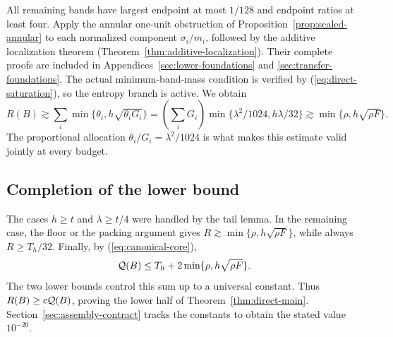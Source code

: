 All remaining bands have largest endpoint at most $1/128$ and
endpoint ratios at least four. Apply the annular one-unit obstruction
of Proposition~\ref{prop:scaled-annular} to each normalized component
$\sigma_i/m_i$, followed by the additive localization theorem
(Theorem~\ref{thm:additive-localization}). Their complete proofs are
included in Appendices~\ref{sec:lower-foundations} and
\ref{sec:transfer-foundations}.
The actual minimum-band-mass condition is verified by
(\ref{eq:direct-saturation}), so the entropy branch is active.
We obtain
\[
 R(B)\gtrsim\sum_i\min\{\theta_i,h\sqrt{\theta_iG_i}\}
 =\left(\sum_iG_i\right)
       \min\{\lambda^2/1024,h\lambda/32\}
 \gtrsim\min\{\rho,h\sqrt{\rho F}\}.
\]
The proportional allocation $\theta_i/G_i=\lambda^2/1024$ is what
makes this estimate valid jointly at every budget.

\subsection{Completion of the lower bound}
The cases $h\ge t$ and $\lambda\ge t/4$ were handled by the tail lemma.
In the remaining case, the floor or the packing argument gives
$R\gtrsim\min\{\rho,h\sqrt{\rho F}\}$, while always $R\ge T_h/32$.
Finally, by (\ref{eq:canonical-core}),
\[
 \mathcal Q(B)\le T_h+2\min\{\rho,h\sqrt{\rho F}\}.
\]
The two lower bounds control this sum up to a universal constant.
Thus $R(B)\ge c\mathcal Q(B)$, proving the lower half of
Theorem~\ref{thm:direct-main}. Section~\ref{sec:assembly-contract}
tracks the constants to obtain the stated value $10^{-20}$.
